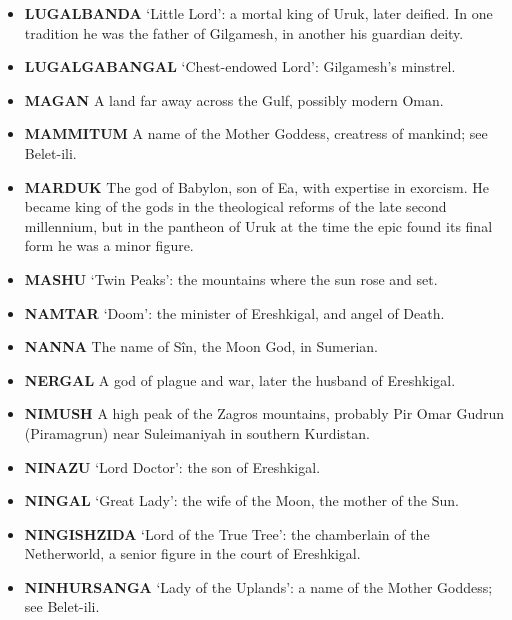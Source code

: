 \documentclass{article}
\begin{document}
\begin{multicols}{3}
\begin{small}
\begin{itemize}[
        label=,
        leftmargin=1.0em,
        itemindent=-1.0em,
        nosep,
    ]
    \item \textbf{LUGALBANDA}
    `Little Lord': a mortal king of Uruk, later deified. In one tradition he
    was the father of Gilgamesh, in another his guardian deity.

    \item \textbf{LUGALGABANGAL}
    `Chest-endowed Lord': Gilgamesh's minstrel.

    \item \textbf{MAGAN}
    A land far away across the Gulf, possibly modern Oman.

    \item \textbf{MAMMITUM}
    A name of the Mother Goddess, creatress of mankind; see Belet-ili.

    \item \textbf{MARDUK} The god of Babylon, son of Ea, with expertise in exorcism.
    He became king of the gods in the theological reforms of the late second
    millennium, but in the pantheon of Uruk at the time the epic found its
    final form he was a minor figure.

    \item \textbf{MASHU}
    `Twin Peaks': the mountains where the sun rose and set.

    \item \textbf{NAMTAR}
    `Doom': the minister of Ereshkigal, and angel of Death.

    \item \textbf{NANNA} The name of Sîn, the Moon God, in Sumerian.

    \item \textbf{NERGAL}
    A god of plague and war, later the husband of Ereshkigal.

    \item \textbf{NIMUSH}
    A high peak of the Zagros mountains, probably Pir Omar Gudrun
    (Piramagrun) near Suleimaniyah in southern Kurdistan.

    \item \textbf{NINAZU}
    `Lord Doctor': the son of Ereshkigal.

    \item \textbf{NINGAL}
    `Great Lady': the wife of the Moon, the mother of the Sun.

    \item \textbf{NINGISHZIDA}
    `Lord of the True Tree': the chamberlain of the Netherworld, a senior
    figure in the court of Ereshkigal.

    \item \textbf{NINHURSANGA}
    `Lady of the Uplands': a name of the Mother Goddess; see Belet-ili.


\end{itemize}
\end{small}
\end{multicols}
\end{document}
